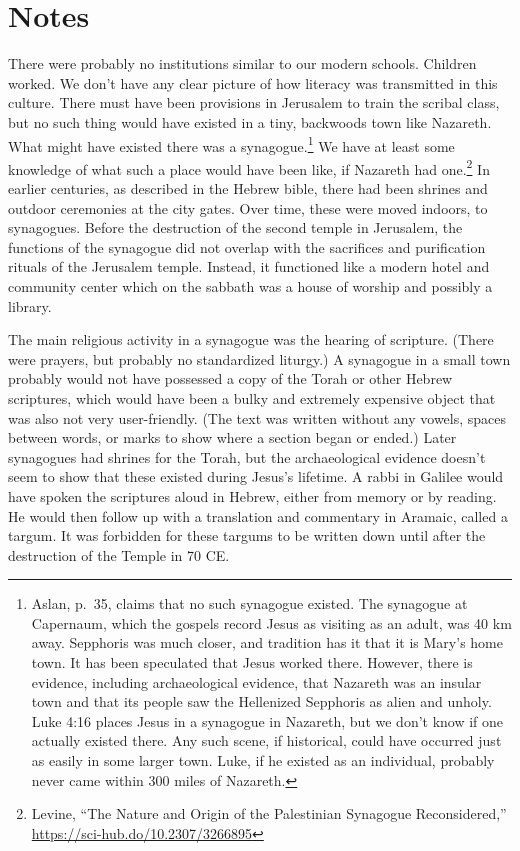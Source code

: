 \documentclass[10pt,twoside]{article} %
\newcommand{\quotesize}{\normalsize{}}
\newcommand{\maintextquotesize}{\renewcommand{\quotesize}{\large{}}}
\newcommand{\notequotesize}{\renewcommand{\quotesize}{\normalsize{}}}
\newenvironment{notesection}[1]{
  \setcounter{secnumdepth}{0}          %
  \section*{#1}
  \setcounter{secnumdepth}{2}          %
  \notequotesize
}%
{
  \maintextquotesize
}
\begin{document}
\begin{notesection}{Notes}
There were probably no institutions similar to our modern schools. Children worked. We don't have any clear picture of how
literacy was transmitted in this culture. There must have been provisions
in Jerusalem to train the scribal class, but no such thing would have existed in a tiny,
backwoods town like Nazareth. What might have existed there was a synagogue.\footnote{Aslan, p.~35, claims that no such synagogue existed. The
synagogue at Capernaum, which the gospels record Jesus as visiting as an adult, was 40 km away. Sepphoris was much closer,
and tradition has it that it is Mary's home town. It has been speculated that Jesus worked there. However, there is evidence, including
archaeological evidence, that Nazareth was an insular town and that its people saw the Hellenized Sepphoris as alien and unholy.
Luke 4:16 places Jesus in a synagogue in
Nazareth, but we don't know if one actually existed there. Any such scene, if historical,
could have occurred just as easily in some larger town. Luke, if he existed as an individual,
probably never came within 300 miles of Nazareth.}
We have at least some knowledge of what such a place would have been like, if Nazareth had 
one.\footnote{Levine, ``The Nature and Origin of the Palestinian Synagogue Reconsidered,'' \url{https://sci-hub.do/10.2307/3266895}}
In earlier centuries, as described in the Hebrew bible, there had been shrines and outdoor ceremonies
at the city gates. Over time, these were moved indoors, to synagogues. Before the destruction of
the second temple in Jerusalem, the functions of the synagogue
did not overlap with the sacrifices and purification rituals of the Jerusalem temple. Instead, it
functioned like a modern hotel and community center which on the sabbath was a house of worship and
possibly a library.

The main religious activity in a synagogue was the hearing of scripture. (There were prayers, but
probably no standardized liturgy.) A synagogue in a small town probably would not have possessed
a copy of the Torah or other Hebrew scriptures, which would have been a bulky and extremely expensive object that was
also not very user-friendly. (The text was written without any vowels, spaces between words, or marks
to show where a section began or ended.) Later synagogues had shrines for the Torah, but the archaeological
evidence doesn't seem to show that these existed during Jesus's lifetime.
A rabbi in Galilee would have spoken the scriptures aloud in Hebrew, either from memory or by reading.
He would then follow up with a translation and commentary in Aramaic, called a targum. It
was forbidden for these targums to be written down until after the destruction of the Temple in 70 CE.


\end{notesection}
\end{document}
